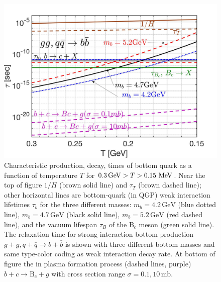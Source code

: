\begin{figure} 
\centerline{\includegraphics[width=0.9\linewidth]{./plots/BQuarkReactionTime003}}
\caption{Characteristic production, decay, times of bottom quark as a function of temperature $T$ for $0.3\,\mathrm{GeV}>T> 0.15\text{ MeV}$. Near the top of figure $1/H$ (brown solid line) and $\tau_T$ (brown dashed line); other horizontal lines are bottom-quark (in QGP) weak interaction lifetimes $\tau_b$ for the three different masses: $m_b=4.2\,\mathrm{GeV}$ (blue dotted line), $m_b=4.7\,\mathrm{GeV}$ (black solid line), $m_b=5.2\,\mathrm{GeV}$ (red dashed line), and the vacuum lifespan $\tau_B$ of the B$_c$ meson (green solid line). The relaxation time for strong interaction bottom production $g+g, q+\bar q\rightarrow b+\bar{b}$ is shown with three different bottom masses and same type-color coding as weak interaction decay rate. At bottom of figure the in plasma formation process (dashed lines, purple) $b+c\rightarrow \mathrm{B}_c+g$ with cross section range $\sigma=0.1,10\,\mathrm{mb}$. }
\label{ReactionTime}
\end{figure}

